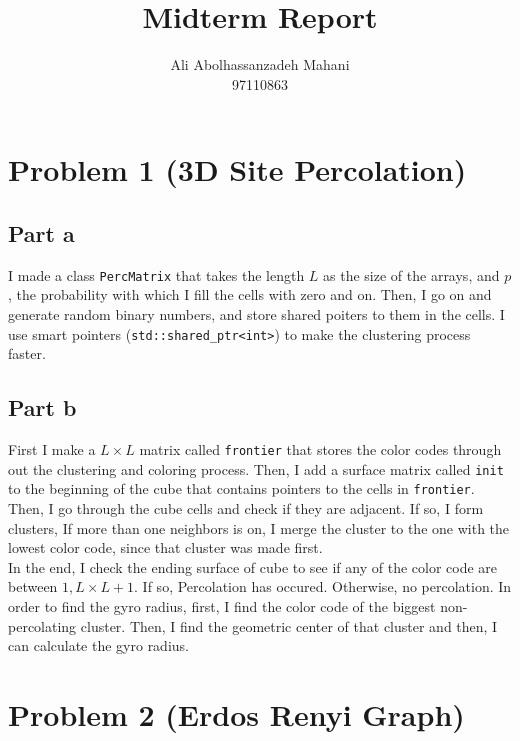 \documentclass[12pt]{article}
\title{Midterm Report}
\author{Ali Abolhassanzadeh Mahani\\ 97110863}
\begin{document}
	\maketitle
	\section{Problem 1 (3D Site Percolation)}
	\subsection{Part a}
	I made a class \texttt{PercMatrix} that takes the length $L$ as the size of the arrays, and $p$, the probability with which I fill the cells with zero and on.
	Then, I go on and generate random binary numbers, and store shared poiters to them in the cells. I use smart pointers (\texttt{std::shared\_ptr<int>}) to make the clustering process faster.
	\subsection{Part b}
	First I make a $L\times L$ matrix called \texttt{frontier} that stores the color codes through out the clustering and coloring process. Then, I add a surface matrix called \texttt{init} to the beginning of the 
	cube that contains pointers to the cells in \texttt{frontier}. Then, I go through the cube cells and check if they are adjacent. If so, I form clusters, If more than one neighbors is on, I merge the cluster to the one with the lowest color code, since that cluster was made first.\\
	In the end, I check the ending surface of cube to see if any of the color code are between $1, L\times L +1$. If so, Percolation has occured. Otherwise, no percolation.
	In order to find the gyro radius, first, I find the color code of the biggest non-percolating cluster. Then, I 
	find the geometric center of that cluster and then, I can calculate the gyro radius.
	
	\section{Problem 2 (Erdos Renyi Graph)}
\end{document}
